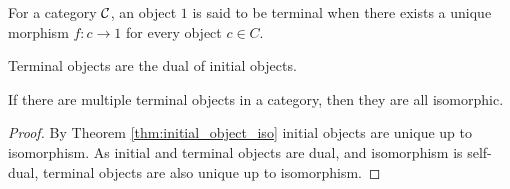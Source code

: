 \begin{definition}
  For a category $\mathcal{C}$, an object $1$ is said to be terminal when there exists a
  unique morphism $f: c\to 1$ for every object $c\in C$.
  \parencite{awodey:category_theory}
\end{definition}

\begin{remark}
  Terminal objects are the dual of initial objects.
\end{remark}

\begin{theorem}\label{thm:terminal_object_iso}
  If there are multiple terminal objects in a category, then they are all
  isomorphic.

  \begin{proof}
    By Theorem \ref{thm:initial_object_iso} initial objects are unique up to
    isomorphism. As initial and terminal objects are dual, and isomorphism is self-dual, terminal objects are also unique up to isomorphism.
  \end{proof}
\end{theorem}
